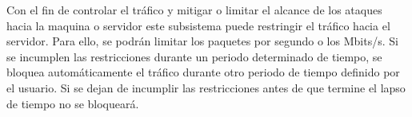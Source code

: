 Con el fin de controlar el tráfico y mitigar o limitar el alcance de los ataques hacia la maquina o servidor este subsistema puede restringir el tráfico hacia el servidor. Para ello, se podrán limitar los paquetes por segundo o los Mbits/s. Si se incumplen las restricciones durante un periodo determinado de tiempo, se bloquea automáticamente el tráfico durante otro periodo de tiempo definido por el usuario. Si se dejan de incumplir las restricciones antes de que termine el lapso de tiempo no se bloqueará.
